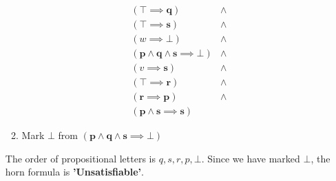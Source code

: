 \documentclass{article}
\begin{document}
\begin{enumerate}
\begin{answer}
\begin{enumerate}
		\begin{displaymath}
    		\begin{array}{ll}
   				      (\top \implies \textbf{q}) &\land \\
                      (\top \implies \textbf{s}) &\land \\
                      (w \implies \bot) &\land \\
                      (\textbf{p} \land \textbf{q} \land \textbf{s} \implies \bot) &\land \\
                      (v \implies \textbf{s}) &\land \\
                      (\top \implies \textbf{r}) &\land \\
                      (\textbf{r} \implies \textbf{p}) &\land \\
                      (\textbf{p} \land \textbf{s} \implies \textbf{s})
    		\end{array}
  		\end{displaymath}
  		
  		\item Mark $\bot$ from $(\textbf{p} \land \textbf{q} \land \textbf{s}
  		\implies \bot)$
  		
	\end{enumerate}
	
	The order of propositional letters is $q, s, r, p,\bot$. 
	Since we have marked $\bot$, the horn formula is \textbf{'Unsatisfiable'}.
\end{answer}

\end{enumerate}
\end{document}
